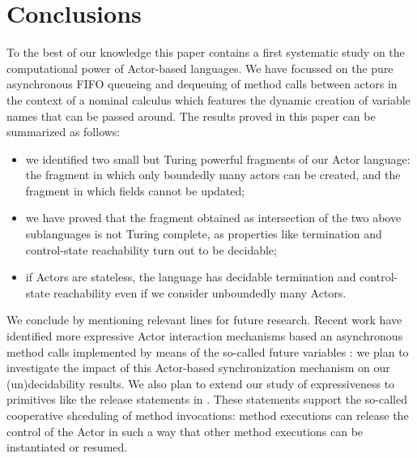 \documentclass{LMCS}
\theoremstyle{plain}\newtheorem{proposition}[thm]{Proposition}
\theoremstyle{plain}\newtheorem{lemma}[thm]{Lemma}
\theoremstyle{plain}\newtheorem{theorem}[thm]{Theorem}
\theoremstyle{plain}\newtheorem{corollary}[thm]{Corollary}
\begin{document}
\section{Conclusions} \label{sec.conclusions}
To the best of our knowledge this paper contains a first systematic study on the computational power of Actor-based languages.
We have focussed on the  pure asynchronous FIFO queueing and dequeuing of method calls between actors in the context of a nominal calculus 
which features the dynamic creation of variable names that can be passed around.
The results proved in this paper can be summarized as follows:
\begin{itemize}
\item
we identified two small but Turing powerful fragments of our Actor language:
the fragment in which only boundedly many actors can be created,
and the fragment in which fields cannot be updated;
\item
we have proved that the fragment obtained as intersection of the 
two above sublanguages is not Turing complete, as properties like
termination and control-state reachability turn out to be decidable;
\item
if Actors are stateless, the language has decidable termination
and control-state reachability even if we consider unboundedly many
Actors. 
\end{itemize}

\noindent We conclude by mentioning 
relevant lines
for future research. Recent work have identified more expressive Actor interaction
mechanisms based an asynchronous method calls implemented by means of the so-called
future variables \cite{BoerCJ07}: we plan to investigate the impact of this
Actor-based synchronization mechanism on our (un)decidability results.
We also plan to extend our study of expressiveness to 
primitives like the release statements in \cite{Johnsen07}. 
These statements support the so-called cooperative shceduling
of method invocations:
method executions can release the 
control of the Actor in such a way that other method executions
can be instantiated or resumed.









\end{document}
